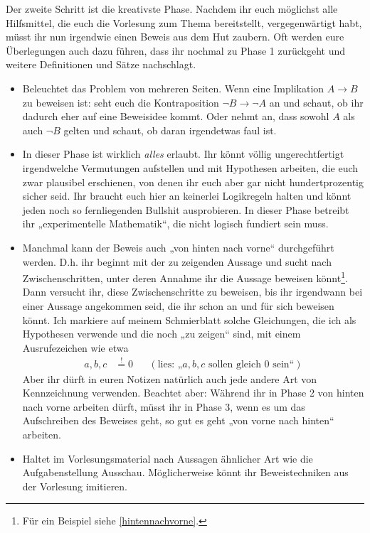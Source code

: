 \begin{de} \label{rumprobieren}
    Der zweite Schritt ist die kreativste Phase. Nachdem ihr euch möglichst alle Hilfsmittel, die euch die Vorlesung zum Thema bereitstellt, vergegenwärtigt habt, müsst ihr nun irgendwie einen Beweis aus dem Hut zaubern. Oft werden eure Überlegungen auch dazu führen, dass ihr nochmal zu Phase 1 zurückgeht und weitere Definitionen und Sätze nachschlagt.
    \begin{itemize}
        \item Beleuchtet das Problem von mehreren Seiten. Wenn eine Implikation $A\to B$ zu beweisen ist: seht euch die Kontraposition $\neg B\to \neg A$ an und schaut, ob ihr dadurch eher auf eine Beweisidee kommt. Oder nehmt an, dass sowohl $A$ als auch $\neg B$ gelten und schaut, ob daran irgendetwas faul ist.
        \item In dieser Phase ist wirklich \emph{alles} erlaubt. Ihr könnt völlig ungerechtfertigt irgendwelche Vermutungen aufstellen und mit Hypothesen arbeiten, die euch zwar plausibel erschienen, von denen ihr euch aber gar nicht hundertprozentig sicher seid. Ihr braucht euch hier an keinerlei Logikregeln halten und könnt jeden noch so fernliegenden Bullshit ausprobieren. In dieser Phase betreibt ihr „experimentelle Mathematik“, die nicht logisch fundiert sein muss.
        \item Manchmal kann der Beweis auch „von hinten nach vorne“ durchgeführt werden. D.h. ihr beginnt mit der zu zeigenden Aussage und sucht nach Zwischenschritten, unter deren Annahme ihr die Aussage beweisen könnt\footnote{Für ein Beispiel siehe \cref{hintennachvorne}.}. Dann versucht ihr, diese Zwischenschritte zu beweisen, bis ihr irgendwann bei einer Aussage angekommen seid, die ihr schon an und für sich beweisen könnt. Ich markiere auf meinem Schmierblatt solche Gleichungen, die ich als Hypothesen verwende und die noch „zu zeigen“ sind, mit einem Ausrufezeichen wie etwa
        \begin{align*}
            a,b,c & \stackrel{!}{=} 0 && (\text{lies: „$a,b,c$ sollen gleich $0$ sein“})
        \end{align*}
        Aber ihr dürft in euren Notizen natürlich auch jede andere Art von Kennzeichnung verwenden. Beachtet aber: Während ihr in Phase 2 von hinten nach vorne arbeiten dürft, müsst ihr in Phase 3, wenn es um das Aufschreiben des Beweises geht, so gut es geht „von vorne nach hinten“ arbeiten.
        \item Haltet im Vorlesungsmaterial nach Aussagen ähnlicher Art wie die Aufgabenstellung Ausschau. Möglicherweise könnt ihr Beweistechniken aus der Vorlesung imitieren.

\end{itemize}
\end{de}
